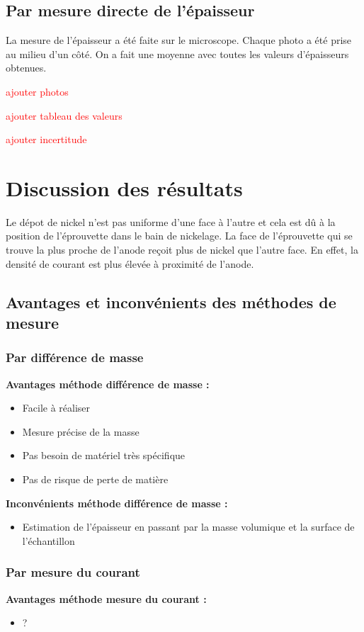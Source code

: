 \subsection{Par mesure directe de l'épaisseur}
La mesure de l'épaisseur a été faite sur le microscope. Chaque 
photo a été prise au milieu d'un côté. On a fait une moyenne avec 
toutes les valeurs d'épaisseurs obtenues.  

\textcolor{red}{ajouter photos}

\textcolor{red}{ajouter tableau des valeurs}

\textcolor{red}{ajouter incertitude}



\section{Discussion des résultats}
Le dépot de nickel n'est pas uniforme d'une face à l'autre et cela est dû à la position de l'éprouvette dans le bain de nickelage. La face de l'éprouvette qui se trouve la plus proche de l'anode reçoit plus de nickel que l'autre face. En effet, la densité de courant est plus élevée à proximité de l'anode.



\subsection{Avantages et inconvénients des méthodes de mesure}
\subsubsection{Par différence de masse}
\textbf{Avantages méthode différence de masse :}
\begin{itemize}
    \item Facile à réaliser
    \item Mesure précise de la masse
    \item Pas besoin de matériel très spécifique
    \item Pas de risque de perte de matière
\end{itemize}

\textbf{Inconvénients méthode différence de masse :}
\begin{itemize}
    \item Estimation de l'épaisseur en passant par la masse volumique et la surface de l'échantillon
\end{itemize}

\subsubsection{Par mesure du courant}
\textbf{Avantages méthode mesure du courant :}
\begin{itemize}
    \item ?
\end{itemize}

